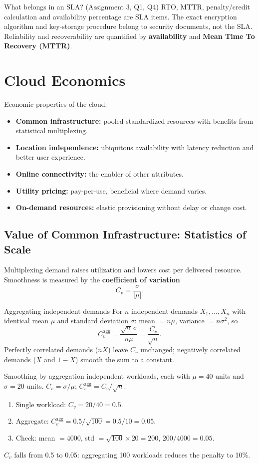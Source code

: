 \begin{notebox}{What belongs in an SLA? (Assignment 3, Q1, Q4)}
RTO, MTTR, penalty/credit calculation and availability percentage are SLA items. The exact encryption algorithm and
key-storage procedure belong to security documents, not the SLA. Reliability and recoverability are quantified by
\textbf{availability} and \textbf{Mean Time To Recovery (MTTR)}.
\end{notebox}

\section{Cloud Economics}
Economic properties of the cloud:
\begin{itemize}[leftmargin=*]
  \item \textbf{Common infrastructure:} pooled standardized resources with benefits from statistical multiplexing.
  \item \textbf{Location independence:} ubiquitous availability with latency reduction and better user experience.
  \item \textbf{Online connectivity:} the enabler of other attributes.
  \item \textbf{Utility pricing:} pay-per-use, beneficial where demand varies.
  \item \textbf{On-demand resources:} elastic provisioning without delay or change cost.
\end{itemize}

\subsection{Value of Common Infrastructure: Statistics of Scale}
Multiplexing demand raises utilization and lowers cost per delivered resource. Smoothness is measured by the
\textbf{coefficient of variation}
\[ C_v = \frac{\sigma}{|\mu|}. \]
\begin{thmbox}{Aggregating independent demands}
For $n$ independent demands $X_1,\dots,X_n$ with identical mean $\mu$ and standard deviation $\sigma$:
mean $= n\mu$, variance $= n\sigma^2$, so
\[ C_v^{\text{agg}} = \frac{\sqrt{n}\,\sigma}{n\mu} = \frac{C_v}{\sqrt{n}}. \]
Perfectly correlated demands ($n X$) leave $C_v$ unchanged; negatively correlated demands ($X$ and $1-X$) smooth the sum
to a constant.
\end{thmbox}

\begin{solved}{Smoothing by aggregation}
 independent workloads, each with $\mu = 40$ units and $\sigma = 20$ units.
\Formula $C_v = \sigma/\mu$; $C_v^{\text{agg}} = C_v/\sqrt{n}$.
\Steps
\begin{enumerate}[leftmargin=*]
  \item Single workload: $C_v = 20/40 = 0.5$.
  \item Aggregate: $C_v^{\text{agg}} = 0.5/\sqrt{100} = 0.5/10 = 0.05$.
  \item Check: mean $= 4000$, std $= \sqrt{100}\times 20 = 200$, $200/4000 = 0.05$.
\end{enumerate}
\Answer $C_v$ falls from 0.5 to 0.05: aggregating 100 workloads reduces the penalty to 10\%.
\end{solved}

